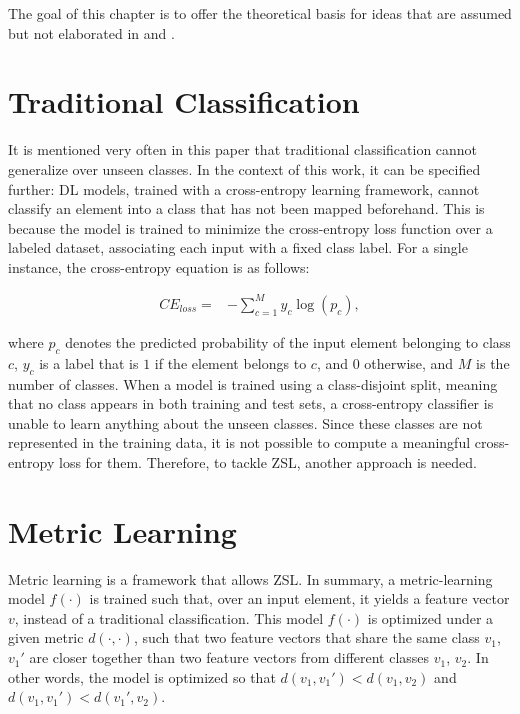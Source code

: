 The goal of this chapter is to offer the theoretical basis for ideas that are assumed but not elaborated in  and .

\section{Traditional Classification}

It is mentioned very often in this paper that traditional classification cannot generalize over unseen classes. In the context of this work, it can be specified further: \gls{DL} models, trained with a cross-entropy learning framework, cannot classify an element into a class that has not been mapped beforehand. This is because the model is trained to minimize the cross-entropy loss function over a labeled dataset, associating each input with a fixed class label. For a single instance, the cross-entropy equation is as follows:

\begin{equation}
    \label{cross_entropy}
    \begin{split}
        CE_{loss} = & -\sum_{c=1}^My_{c}\log(p_{c}),
    \end{split}
\end{equation}

where $p_{c}$ denotes the predicted probability of the input element belonging to class $c$, $y_{c}$ is a label that is $1$ if the element belongs to $c$, and $0$ otherwise, and $M$ is the number of classes. When a model is trained using a class-disjoint split, meaning that no class appears in both training and test sets, a cross-entropy classifier is unable to learn anything about the unseen classes. Since these classes are not represented in the training data, it is not possible to compute a meaningful cross-entropy loss for them. Therefore, to tackle \gls{ZSL}, another approach is needed.

\section{Metric Learning}

Metric learning is a framework that allows \gls{ZSL}. In summary, a metric-learning model  \( f(\cdot) \) is trained such that, over an input element, it yields a feature vector $v$, instead of a traditional classification. This model \( f(\cdot) \) is optimized under a given metric \( d(\cdot, \cdot) \), such that two feature vectors that share the same class $v_1$, $v_1'$ are closer together than two feature vectors from different classes $v_1$, $v_2$. In other words, the model is optimized so that $d(v_1, v_1') < d(v_1, v_2)$ and $d(v_1, v_1') < d(v_1', v_2)$.

